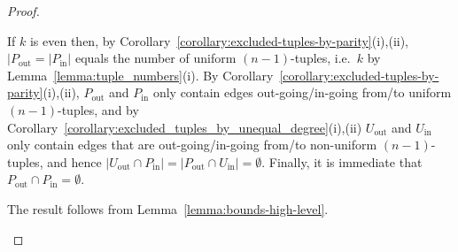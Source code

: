 \documentclass[10pt,a4paper]{amsart}
\begin{document}
\begin{proof}
\begin{itemize}
    If $k$ is even then, by Corollary~\ref{corollary:excluded-tuples-by-parity}(i),(ii),
    $|P_{\text{out}}=|P_{\text{in}}|$ equals the number of uniform $(n-1)$-tuples, i.e.\ $k$ by
    Lemma~\ref{lemma:tuple_numbers}(i).
    \newline By Corollary~\ref{corollary:excluded-tuples-by-parity}(i),(ii), $P_{\text{out}}$
    and $P_{\text{in}}$ only contain edges out-going/in-going from/to uniform $(n-1)$-tuples,
    and by Corollary~\ref{corollary:excluded_tuples_by_unequal_degree}(i),(ii) $U_{\text{out}}$
    and $U_{\text{in}}$ only contain edges that are out-going/in-going from/to non-uniform
    $(n-1)$-tuples, and hence $|U_{\text{out}}\cap P_{\text{in}}|=|P_{\text{out}}\cap
    U_{\text{in}}|=\emptyset$.
    \newline Finally, it is immediate that $P_{\text{out}}\cap P_{\text{in}}=\emptyset$.

    The result follows from Lemma~\ref{lemma:bounds-high-level}.

\end{itemize}
\end{proof}
\end{document}
